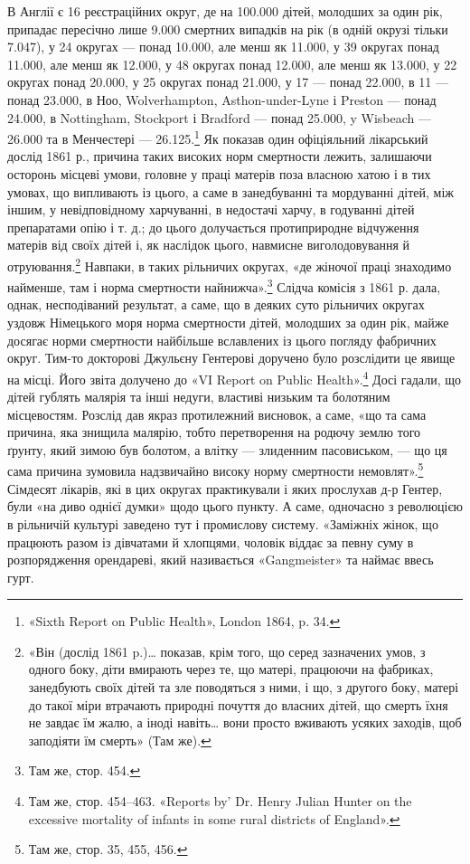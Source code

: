 \parcont{}  %
В Англії є 16 реєстраційних округ, де на \num{100.000} дітей, молодших
за один рік, припадає пересічно лише \num{9.000} смертних випадків
на рік (в одній окрузі тільки \num{7.047}), у 24 округах — понад \num{10.000},
але менш як \num{11.000}, у 39 округах понад \num{11.000}, але менш як \num{12.000},
у 48 округах понад \num{12.000}, але менш як \num{13.000}, у 22 округах
понад \num{20.000}, у 25 округах понад \num{21.000}, у 17 — понад \num{22.000},
в 11 — понад \num{23.000}, в Ноо, Wolverhampton, Asthon-under-Lyne
і Preston — понад \num{24.000}, в Nottingham, Stockport і Bradford —
понад \num{25.000}, y Wisbeach — \num{26.000} та в Менчестері — \num{26.125}.\footnote{
«Sixth Report on Public Health», London 1864, p. 34.
}
Як показав один офіціяльний лікарський дослід 1861 р., причина
таких високих норм смертности лежить, залишаючи осторонь
місцеві умови, головне у праці матерів поза власною хатою і в
тих умовах, що випливають із цього, а саме в занедбуванні та
мордуванні дітей, між іншим, у невідповідному харчуванні, в
недостачі харчу, в годуванні дітей препаратами опію і т. д.;
до цього долучається протиприродне відчуження матерів від
своїх дітей і, як наслідок цього, навмисне виголодовування й
отруювання.\footnote{
«Він (дослід 1861 p.)\dots{} показав, крім того, що серед зазначених
умов, з одного боку, діти вмирають через те, що матері, працюючи на фабриках,
занедбують своїх дітей та зле поводяться з ними, і що, з другого
боку, матері до такої міри втрачають природні почуття до власних
дітей, що смерть їхня не завдає їм жалю, а іноді навіть\dots{} вони просто вживають
усяких заходів, щоб заподіяти їм смерть» (Там же).
} Навпаки, в таких рільничих округах, «де жіночої
праці знаходимо найменше, там і норма смертности найнижча».\footnote{
Там же, стор. 454.
}
Слідча комісія з 1861 р. дала, однак, несподіваний результат,
а саме, що в деяких суто рільничих округах уздовж Німецького
моря норма смертности дітей, молодших за один рік, майже
досягає норми смертности найбільше вславлених із цього погляду
фабричних округ. Тим-то докторові Джульєну Гентерові доручено
було розслідити це явище на місці. Його звіта долучено до
«VI Report on Public Health».\footnote{
Там же, стор. 454--463. «Reports by' Dr. Henry Julian Hunter
on the excessive mortality of infants in some rural districts of England».
} Досі гадали, що дітей гублять малярія
та інші недуги, властиві низьким та болотяним місцевостям.
Розслід дав якраз протилежний висновок, а саме, «що та сама
причина, яка знищила малярію, тобто перетворення на родючу
землю того ґрунту, який зимою був болотом, а влітку — злиденним
пасовиськом, — що ця сама причина зумовила надзвичайно
високу норму смертности немовлят».\footnote{
Там же, стор. 35, 455, 456.
} Сімдесят лікарів, які
в цих округах практикували і яких прослухав д-р Гентер,
були «на диво однієї думки» щодо цього пункту. А саме, одночасно
з революцією в рільничій культурі заведено тут і промислову
систему. «Заміжніх жінок, що працюють разом із дівчатами й
хлопцями, чоловік віддає за певну суму в розпорядження орендареві,
який називається «Gangmeister» та наймає ввесь гурт.
\parbreak{}  %
